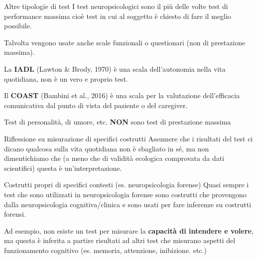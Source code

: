 \documentclass[
  ignorenonframetext,
]{beamer}
\begin{document}
\begin{frame}{Altre tipologie di test}
\label{altre-tipologie-di-test}
I test neuropsicologici sono il più delle volte test di performance
massima cioè test in cui al soggetto è chiesto di fare il meglio
possibile.

Talvolta vengono usate anche scale funzionali o questionari (non di
prestazione massima).

La \textbf{IADL} (Lawton \& Brody, 1970) è una scala dell'autonomia
nella vita quotidiana, non è un vero e proprio test.

Il \textbf{COAST} (Bambini et al., 2016) è una scala per la valutazione
dell'efficacia comunicativa dal punto di vista del paziente o del
caregiver.

Test di personalità, di umore, etc. \textbf{NON} sono test di
prestazione massima
\end{frame}


\begin{frame}{Riflessione su misurazione di specifici costrutti}
\label{riflessione-su-misurazione-di-specifici-costrutti-1}
Assumere che i risultati del test ci dicano qualcosa sulla vita
quotidiana non è sbagliato in sé, ma non dimentichiamo che (a meno che
di validità ecologica comprovata da dati scientifici) questa è
un'interpretazione.
\end{frame}

\begin{frame}{Costrutti propri di specifici contesti (es.
neuropsicologia forense)}
\label{costrutti-propri-di-specifici-contesti-es.-neuropsicologia-forense}
Quasi sempre i test che sono utilizzati in neuropsicologia forense sono
costrutti che provengono dalla neuropsicologia cognitiva/clinica e sono
usati per fare inferenze su costrutti forensi.

Ad esempio, non esiste un test per misurare la \textbf{capacità di
intendere e volere}, ma questa è inferita a partire risultati ad altri
test che misurano aspetti del funzionamento cognitivo (es. memoria,
attenzione, inibizione. etc.)
\end{frame}
\end{document}
